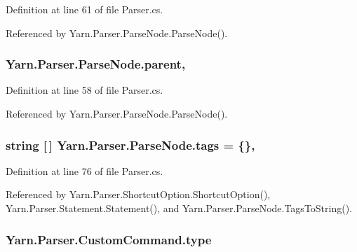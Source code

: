Definition at line 61 of file Parser.\-cs.



Referenced by Yarn.\-Parser.\-Parse\-Node.\-Parse\-Node().

\hypertarget{a00142_af313a82103fcc2ff5a177dbb06b92f7b}{
\subsubsection[{parent}]{ Yarn.\-Parser.\-Parse\-Node.\-parent\hspace{0.3cm}{\ttfamily [package]}, {\ttfamily [inherited]}}}\label{a00142_af313a82103fcc2ff5a177dbb06b92f7b}


Definition at line 58 of file Parser.\-cs.



Referenced by Yarn.\-Parser.\-Parse\-Node.\-Parse\-Node().

\hypertarget{a00142_a58b3a15788fd2d4127d73619dc6d04ae}{
\subsubsection[{tags}]{\setlength{\rightskip}{0pt plus 5cm}string \mbox{[}$\,$\mbox{]} Yarn.\-Parser.\-Parse\-Node.\-tags = \{\}\hspace{0.3cm}{\ttfamily [package]}, {\ttfamily [inherited]}}}\label{a00142_a58b3a15788fd2d4127d73619dc6d04ae}


Definition at line 76 of file Parser.\-cs.



Referenced by Yarn.\-Parser.\-Shortcut\-Option.\-Shortcut\-Option(), Yarn.\-Parser.\-Statement.\-Statement(), and Yarn.\-Parser.\-Parse\-Node.\-Tags\-To\-String().

\hypertarget{a00077_a5ef3bc96812be224d91548bfcdfd4b92}{
\subsubsection[{type}]{ Yarn.\-Parser.\-Custom\-Command.\-type\hspace{0.3cm}{\ttfamily [package]}}}\label{a00077_a5ef3bc96812be224d91548bfcdfd4b92}


